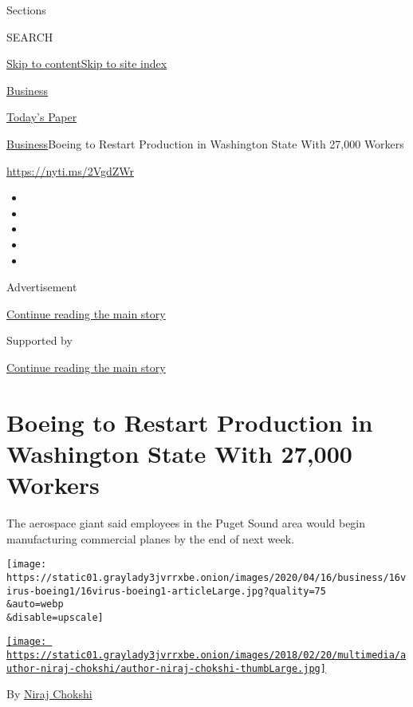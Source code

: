 Sections

SEARCH

\protect\hyperlink{site-content}{Skip to
content}\protect\hyperlink{site-index}{Skip to site index}

\href{https://www.nytimes3xbfgragh.onion/section/business}{Business}

\href{https://myaccount.nytimes3xbfgragh.onion/auth/login?response_type=cookie\&client_id=vi}{}

\href{https://www.nytimes3xbfgragh.onion/section/todayspaper}{Today's
Paper}

\href{/section/business}{Business}\textbar{}Boeing to Restart Production
in Washington State With 27,000 Workers

\url{https://nyti.ms/2VgdZWr}

\begin{itemize}
\item
\item
\item
\item
\item
\end{itemize}

Advertisement

\protect\hyperlink{after-top}{Continue reading the main story}

Supported by

\protect\hyperlink{after-sponsor}{Continue reading the main story}

\hypertarget{boeing-to-restart-production-in-washington-state-with-27000-workers}{%
\section{Boeing to Restart Production in Washington State With 27,000
Workers}\label{boeing-to-restart-production-in-washington-state-with-27000-workers}}

The aerospace giant said employees in the Puget Sound area would begin
manufacturing commercial planes by the end of next week.

\texttt{[image: https://static01.graylady3jvrrxbe.onion/images/2020/04/16/business/16virus-boeing1/16virus-boeing1-articleLarge.jpg?quality=75\\\&auto=webp\\\&disable=upscale]}

\href{https://www.nytimes3xbfgragh.onion/by/niraj-chokshi}{\texttt{[image: https://static01.graylady3jvrrxbe.onion/images/2018/02/20/multimedia/author-niraj-chokshi/author-niraj-chokshi-thumbLarge.jpg]}}

By \href{https://www.nytimes3xbfgragh.onion/by/niraj-chokshi}{Niraj
Chokshi}

